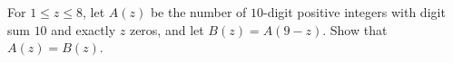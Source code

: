 For $1\le z\le8$, let $A(z)$ be the number of $10$-digit positive integers with digit sum $10$ and exactly $z$ zeros, and let $B(z)=A(9-z)$. Show that $A(z)=B(z)$.
